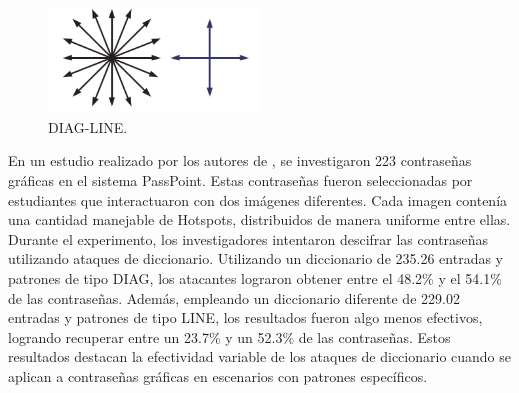 \documentclass[12pt]{report}
\begin{document}
\begin{figure}[ht]
	\centering
	\includegraphics[width=0.5\textwidth]{DIAG_LINE.png}
	\caption{DIAG-LINE.}
	\label{fig:DIAG_LINE}
\end{figure}



En un estudio realizado por los autores de \cite{21,22}, se investigaron 223 contraseñas gráficas en el sistema PassPoint. Estas contraseñas fueron seleccionadas por estudiantes que interactuaron con dos imágenes diferentes. Cada imagen contenía una cantidad manejable de Hotspots, distribuidos de manera uniforme entre ellas. Durante el experimento, los investigadores intentaron descifrar las contraseñas utilizando ataques de diccionario. Utilizando un diccionario de 235.26 entradas y patrones de tipo DIAG, los atacantes lograron obtener entre el 48.2\% y el 54.1\% de las contraseñas. Además, empleando un diccionario diferente de 229.02 entradas y patrones de tipo LINE, los resultados fueron algo menos efectivos, logrando recuperar entre un 23.7\% y un 52.3\% de las contraseñas. Estos resultados destacan la efectividad variable de los ataques de diccionario cuando se aplican a contraseñas gráficas en escenarios con patrones específicos.
\end{document}
